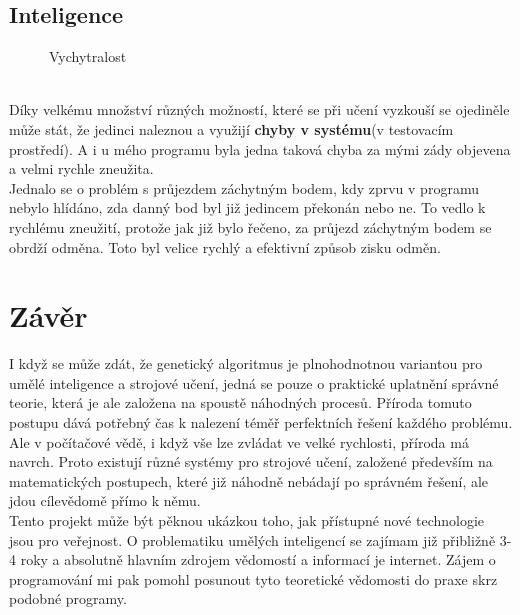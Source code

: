 \documentclass[a4paper,12pt]{article}
\newcommand{\tab}
{
    \hspace*{1em}
}
\begin{document}
        \vspace{-2em}
        \subsection{Inteligence}
            \hfill
            \vspace{-2em}
            \begin{figure}
                \centering
                \caption{Vychytralost} 
                \label{fig:intel}
            \end{figure}
            \\
            \tab Díky velkému množství různých možností, které se při učení vyzkouší se ojediněle může stát,
            že jedinci naleznou a využijí \textbf{chyby v systému}(v testovacím prostředí). 
            A i u mého programu byla jedna taková chyba za mými zády objevena a velmi rychle zneužita.\\
            Jednalo se o problém s průjezdem záchytným bodem, kdy zprvu v programu nebylo hlídáno, zda danný 
            bod byl již jedincem překonán nebo ne. To vedlo k rychlému zneužití, protože jak již bylo řečeno,
            za průjezd záchytným bodem se obrdží odměna. Toto byl velice rychlý a efektivní způsob zisku odměn.

    \section{Závěr}
        \tab I když se může zdát, že genetický algoritmus je plnohodnotnou variantou pro umělé inteligence
        a strojové učení, jedná se pouze o praktické uplatnění správné teorie, která je ale založena na spoustě náhodných procesů.
        Příroda tomuto postupu dává potřebný čas k nalezení téměř perfektních řešení každého problému.
        Ale v počítačové vědě, i když vše lze zvládat ve velké rychlosti, příroda má navrch.
        Proto existují různé systémy pro strojové učení, založené především na matematických postupech,
        které již náhodně nebádají po správném řešení, ale jdou cílevědomě přímo k němu.\\
        \tab Tento projekt může být pěknou ukázkou toho, jak přístupné nové technologie jsou pro veřejnost.
        O problematiku umělých inteligencí se zajímam již přibližně 3-4 roky a absolutně
        hlavním zdrojem vědomostí a informací je internet. Zájem o programování mi pak pomohl 
        posunout tyto teoretické vědomosti do praxe skrz podobné programy.
\end{document}

